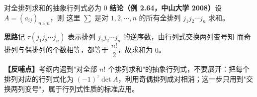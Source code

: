 \begin{fdeep}{对全排列求和的抽象行列式必为 $0$}
\textbf{结论（例 2.64，中山大学 2008）}\quad 设 $A=(a_{ij})_{n\times n}$，则
这里 $\sum$ 是对 $1,2,\cdots,n$ 的所有全排列 $j_1j_2\cdots j_n$ 求和。

\textbf{思路}\quad 记 $\tau(j_1j_2\cdots j_n)$ 表示排列 $j_1j_2\cdots j_n$ 的逆序数，由行列式交换两列变号知
而奇排列与偶排列的个数相等，都等于 $\dfrac{n!}{2}$，故求和为 $0$。

\textbf{【反哺点】}考纲内遇到"对全部 $n!$ 个排列求和"的抽象行列式，不要展开：把每个排列对应的行列式化为 $(-1)^{\tau}\det A$，利用奇偶排列成对相消；这一步只用到"交换两列变号"，属于行列式性质的标准应用。
\end{fdeep}


